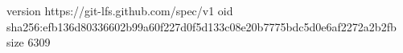 version https://git-lfs.github.com/spec/v1
oid sha256:efb136d80336602b99a60f227d0f5d133c08e20b7775bdc5d0e6af2272a2b2fb
size 6309
